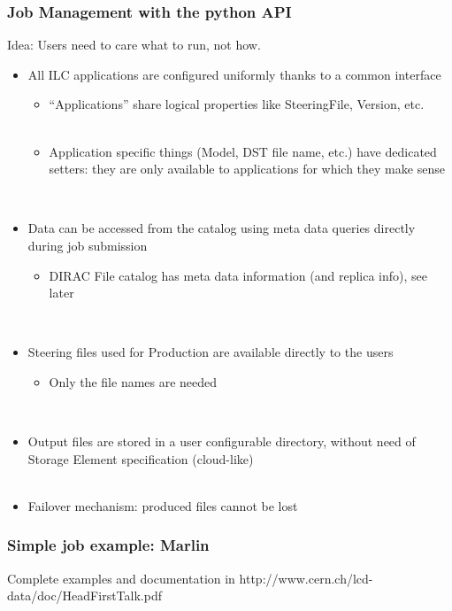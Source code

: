 \documentclass[10pt,table,dvipsnames]{beamer}
\begin{document}
\begin{frame}
  \frametitle{Job Management with the python API}
Idea: \alert{Users need to care what to run, not how.}
\begin{itemize}
\item All ILC {\color{NavyBlue}applications are configured uniformly} thanks to a common interface
  \begin{itemize}
  \item {\color{ForestGreen} ``Applications'' share logical properties} like SteeringFile,
    Version, etc.\\
~\\
  \item {\color{ForestGreen}Application specific things} (Model, DST file name, etc.) have
    {\color{ForestGreen} dedicated setters}: they are only available to applications for
    which they make sense
  \end{itemize}
~\\
\item {\color{NavyBlue}Data can be accessed} from the catalog using {\color{NavyBlue}meta data queries}
  directly during job submission
  \begin{itemize}
  \item DIRAC File catalog has meta data information (and replica
    info), see later\\
  \end{itemize}
~\\
\item {\color{NavyBlue}Steering files} used for Production are {\color{NavyBlue}available directly} to the
  users
  \begin{itemize}
  \item Only the file names are needed
  \end{itemize}
~\\
\item {\color{NavyBlue}Output files} are stored in a user configurable directory,
  without need of Storage Element specification
  ({\color{NavyBlue}cloud-like})\\
~\\
\item Failover mechanism: \alert{produced files cannot be lost}
\end{itemize}
\end{frame}

\begin{frame}
  \frametitle{Simple job example: Marlin} 
 
Complete examples and documentation in {\color{blue}http://www.cern.ch/lcd-data/doc/HeadFirstTalk.pdf}
\end{frame}
\end{document}
